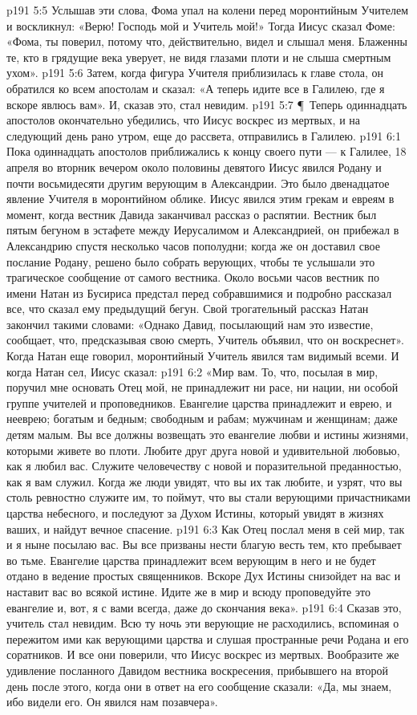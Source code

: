 \vs p191 5:5 Услышав эти слова, Фома упал на колени перед моронтийным Учителем и воскликнул: «Верю! Господь мой и Учитель мой!» Тогда Иисус сказал Фоме: «Фома, ты поверил, потому что, действительно, видел и слышал меня. Блаженны те, кто в грядущие века уверует, не видя глазами плоти и не слыша смертным ухом».
\vs p191 5:6 Затем, когда фигура Учителя приблизилась к главе стола, он обратился ко всем апостолам и сказал: «А теперь идите все в Галилею, где я вскоре явлюсь вам». И, сказав это, стал невидим.
\vs p191 5:7 \P\ Теперь одиннадцать апостолов окончательно убедились, что Иисус воскрес из мертвых, и на следующий день рано утром, еще до рассвета, отправились в Галилею.
\vs p191 6:1 Пока одиннадцать апостолов приближались к концу своего пути --- к Галилее, 18 апреля во вторник вечером около половины девятого Иисус явился Родану и почти восьмидесяти другим верующим в Александрии. Это было двенадцатое явление Учителя в моронтийном облике. Иисус явился этим грекам и евреям в момент, когда вестник Давида заканчивал рассказ о распятии. Вестник был пятым бегуном в эстафете между Иерусалимом и Александрией, он прибежал в Александрию спустя несколько часов пополудни; когда же он доставил свое послание Родану, решено было собрать верующих, чтобы те услышали это трагическое сообщение от самого вестника. Около восьми часов вестник по имени Натан из Бусириса предстал перед собравшимися и подробно рассказал все, что сказал ему предыдущий бегун. Свой трогательный рассказ Натан закончил такими словами: «Однако Давид, посылающий нам это известие, сообщает, что, предсказывая свою смерть, Учитель объявил, что он воскреснет». Когда Натан еще говорил, моронтийный Учитель явился там видимый всеми. И когда Натан сел, Иисус сказал:
\vs p191 6:2 «Мир вам. То, что, посылая в мир, поручил мне основать Отец мой, не принадлежит ни расе, ни нации, ни особой группе учителей и проповедников. Евангелие царства принадлежит и еврею, и нееврею; богатым и бедным; свободным и рабам; мужчинам и женщинам; даже детям малым. Вы все должны возвещать это евангелие любви и истины жизнями, которыми живете во плоти. Любите друг друга новой и удивительной любовью, как я любил вас. Служите человечеству с новой и поразительной преданностью, как я вам служил. Когда же люди увидят, что вы их так любите, и узрят, что вы столь ревностно служите им, то поймут, что вы стали верующими причастниками царства небесного, и последуют за Духом Истины, который увидят в жизнях ваших, и найдут вечное спасение.
\vs p191 6:3 Как Отец послал меня в сей мир, так и я ныне посылаю вас. Вы все призваны нести благую весть тем, кто пребывает во тьме. Евангелие царства принадлежит всем верующим в него и не будет отдано в ведение простых священников. Вскоре Дух Истины снизойдет на вас и наставит вас во всякой истине. Идите же в мир и всюду проповедуйте это евангелие и, вот, я с вами всегда, даже до скончания века».
\vs p191 6:4 Сказав это, учитель стал невидим. Всю ту ночь эти верующие не расходились, вспоминая о пережитом ими как верующими царства и слушая пространные речи Родана и его соратников. И все они поверили, что Иисус воскрес из мертвых. Вообразите же удивление посланного Давидом вестника воскресения, прибывшего на второй день после этого, когда они в ответ на его сообщение сказали: «Да, мы знаем, ибо видели его. Он явился нам позавчера».
